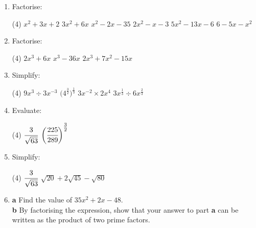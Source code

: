 \documentclass[fleqn]{article}
\begin{document}
\begin{enumerate}
    \item Factorise:
        \begin{tasks}(4) %
            \task $x^2+3x+2$            %
            \task $3x^2+6x$             %
            \task $x^2-2x-35$           %
            \task $2x^2-x-3$            %
            \task $5x^2-13x-6$          %
            \task $6-5x-x^2$            %
        \end{tasks}
        
    \item Factorise:
        \begin{tasks}(4)%
            \task $2x^3+6x$            %
            \task $x^3-36x$            %
            \task $2x^3+7x^2-15x$      %
        \end{tasks}
        
    \item Simplify: \vspace{-2mm}
        \begin{tasks}(4) %
            \task $9x^3 \div 3x^{-3}$
            \task $\big(4^{\textstyle\frac{3}{2}}\big)^{\textstyle\frac{1}{3}}$
            \task $3x^{-2} \times 2x^4$
            \task $3x^{\textstyle\frac{1}{3}} \div 6x^{\textstyle\frac{2}{3}}$
        \end{tasks}
        
    \item Evaluate: \vspace{-2mm}
        \begin{tasks}(4) %
            \task $\cfrac{3}{\sqrt{63}}$
            \task $\bigg(\cfrac{225}{289}\bigg)^{\textstyle\frac{3}{2}}$
        \end{tasks}
        
    \item Simplify: \vspace{-2mm} %
        \begin{tasks}(4)
            \task $\cfrac{3}{\sqrt{63}}$                %
            \task $\sqrt{20}+2\sqrt{45}-\sqrt{80}$      %
        \end{tasks}
        
    \item \hspace*{2mm}\textbf{a}\hspace*{5mm} Find the value of $35x^2+2x-48$.\vspace{1mm}\\
          \hspace*{2mm}\textbf{b}\hspace*{5mm} By factorising the expression, show that your answer to part \textbf{a} can be written as the product of two \linebreak\hspace*{10.5mm}prime factors.
          

\end{enumerate}
\end{document}
